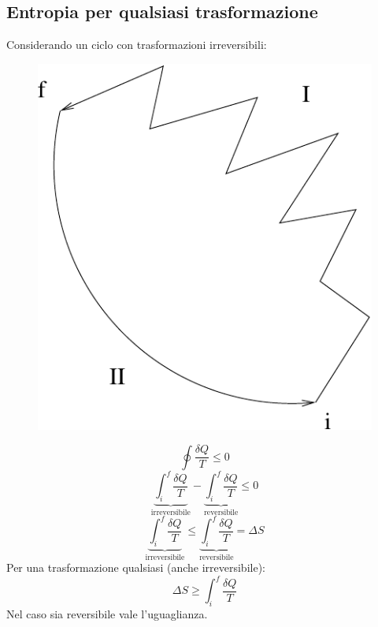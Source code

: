 \subsection{Entropia per qualsiasi trasformazione}
Considerando un ciclo con trasformazioni irreversibili:
\begin{figure}[!htbp]
\centering
\includegraphics[scale=0.5]{immagini/fisica1/ciclo_misto}
\end{figure}

\begin{equation*}\oint\frac{\delta Q}{T}\leq 0\end{equation*}
\begin{equation*}\underbrace{\int_i^f\frac{\delta Q}{T}}_\text{irreversibile}-\underbrace{\int_i^f\frac{\delta Q}{T}}_\text{reversibile}\leq 0\end{equation*}
\begin{equation*}\underbrace{\int_i^f\frac{\delta Q}{T}}_\text{irreversibile}\leq\underbrace{\int_i^f\frac{\delta Q}{T}}_\text{reversibile}=\Delta S\end{equation*}
Per una trasformazione qualsiasi (anche irreversibile):
\begin{equation*}\Delta S\geq\int_i^f\frac{\delta Q}{T}\end{equation*}
Nel caso sia reversibile vale l'uguaglianza.


